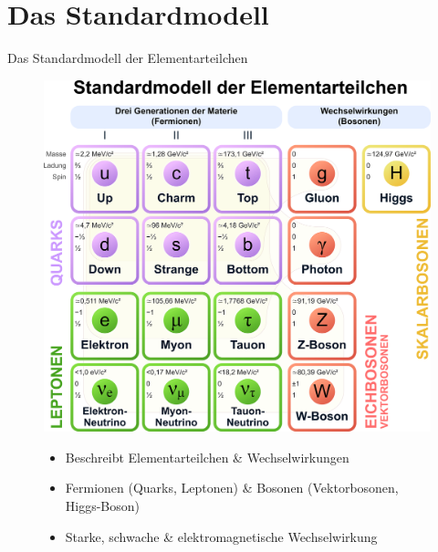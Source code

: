 \documentclass[aspectratio=169]{beamer} %
\begin{document}
    \section{Das Standardmodell}
    \begin{frame}{Das Standardmodell der Elementarteilchen}
      \begin{figure}
        \centering
        \begin{minipage}{0.5\textwidth}
          \centering
          \includegraphics[width=\textwidth, keepaspectratio, height=0.85\textheight]{Standard_Model_of_Elementary_Particles_normal.png}\tiny
          \\\end{minipage}
        \hfill
        \begin{minipage}{0.48\textwidth}
          \begin{itemize}
            \item Beschreibt Elementarteilchen \& Wechselwirkungen
            \item Fermionen (Quarks, Leptonen) \& Bosonen (Vektorbosonen, Higgs-Boson)
            \item Starke, schwache \& elektromagnetische Wechselwirkung
          \end{itemize}
          \end{minipage}
      \end{figure}
    \end{frame}
\end{document}
